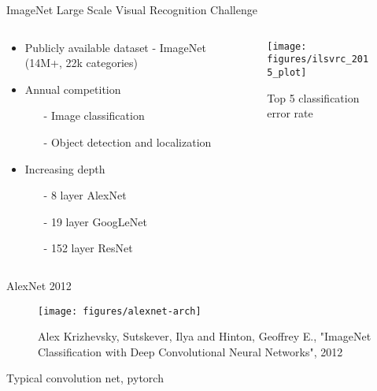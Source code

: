 \begin{frame}{ImageNet Large Scale Visual Recognition Challenge}
	\begin{columns}
		\begin{column}{.5\textwidth}
			\begin{itemize}
				\item Publicly available dataset - ImageNet (14M+, 22k categories)
				\item Annual competition 
				\begin{itemize}
					\item[-] Image classification 
					\item[-] Object detection and localization
				\end{itemize}
				\item Increasing depth 
				\begin{itemize}
					\item[-] 8 layer AlexNet
					\item[-] 19 layer  GoogLeNet
					\item[-] 152 layer ResNet 
				\end{itemize}
				
			\end{itemize}
		\end{column}
		\begin{column}{.5\textwidth}
			\begin{figure}
				\texttt{[image: figures/ilsvrc\_2015\_plot]}
				\caption*{Top 5 classification error rate}
			\end{figure}
		\end{column}
	\end{columns}
\end{frame}

\begin{frame}{AlexNet 2012}
	\begin{figure}
		\texttt{[image: figures/alexnet-arch]}
		\caption*{Alex Krizhevsky, Sutskever, Ilya and Hinton, Geoffrey E., "ImageNet Classification with Deep Convolutional Neural Networks", 2012 }
	\end{figure}
\end{frame}
\begin{frame}{Typical convolution net, pytorch}
	
\end{frame}


